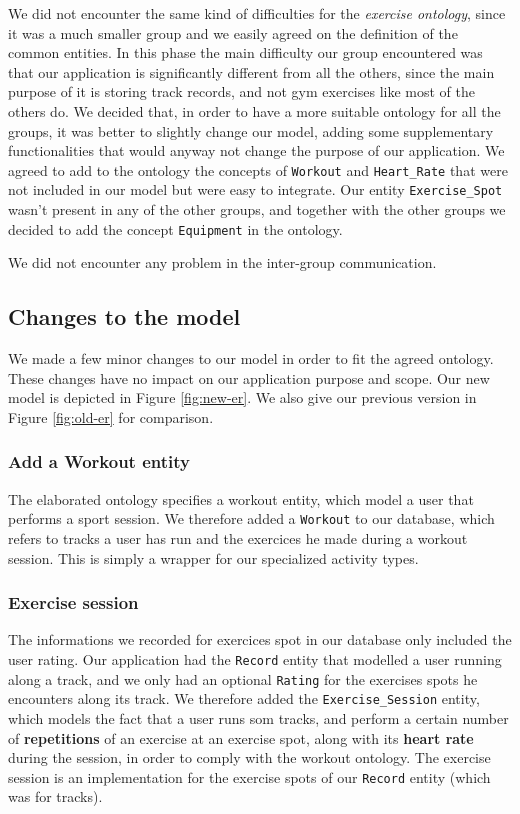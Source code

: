 \documentclass[a4paper]{article}
\begin{document}
We did not encounter the same kind of difficulties for the \textit{exercise ontology}, since it was a much smaller group and we easily agreed on the definition of the common entities.
In this phase the main difficulty our group encountered was that our application is significantly different from all the others, since the main purpose of it is storing track records, and not gym exercises like most of the others do.
We decided that, in order to have a more suitable ontology for all the groups, it was better to slightly change our model, adding some supplementary functionalities that would anyway not change the purpose of our application. 
We agreed to add to the ontology the concepts of \texttt{Workout} and \texttt{Heart\_Rate} that were not included in our model but were easy to integrate. 
Our entity \texttt{Exercise\_Spot} wasn't present in any of the other groups, and together with the other groups we decided to add the concept \texttt{Equipment} in the ontology.

We did not encounter any problem in the inter-group communication. 

\subsection{Changes to the model}
We made a few minor changes to our model in order to fit the agreed ontology. These changes have no impact on our application purpose and scope. Our new model is depicted in Figure \ref{fig:new-er}. We also give our previous version in Figure \ref{fig:old-er} for comparison.

\subsubsection{Add a Workout entity}
The elaborated ontology specifies a workout entity, which model a user that performs a sport session. We therefore added a \texttt{Workout} to our database, which refers to tracks a user has run and the exercices he made during a workout session. This is simply a wrapper for our specialized activity types.

\subsubsection{Exercise session}
The informations we recorded for exercices spot in our database only included the user rating. Our application had the \texttt{Record} entity that modelled a user running along a track, and we only had an optional \texttt{Rating} for the exercises spots he encounters along its track. We therefore added the \texttt{Exercise\_Session} entity, which models the fact that a user runs som tracks, and perform a certain number of \textbf{repetitions} of an exercise at an exercise spot, along with its \textbf{heart rate} during the session, in order to comply with the workout ontology. The exercise session is an implementation for the exercise spots of our \texttt{Record} entity (which was for tracks).
\end{document}
